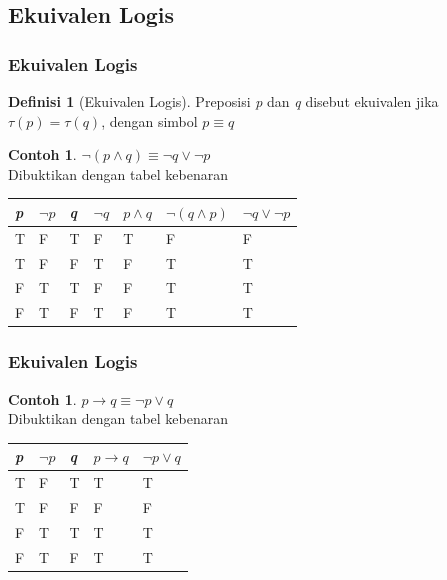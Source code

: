 \documentclass[handout]{beamer}
\theoremstyle{definition}
\newtheorem{definisi}[theorem]{Definisi}
\theoremstyle{example}
\newtheorem{contoh}[theorem]{Contoh}
\begin{document}
\subsection{Ekuivalen Logis}
\begin{frame}
   \frametitle{Ekuivalen Logis}
   \begin{definisi}[Ekuivalen Logis]
   	 Preposisi \textit{p} dan \textit{q} disebut ekuivalen jika $\tau(p)=\tau(q)$, dengan simbol $p \equiv q$
   \end{definisi}
   
   \begin{contoh}
   	$\neg(p \wedge q) \equiv \neg q \vee \neg p$\\
   	Dibuktikan dengan tabel kebenaran\\
   	\begin{tabular}{ | l | l | l | l | l | l | l |}
   		\hline
   		\textit{p} & $\neg p$& \textit{q} &$\neg q$& $p \wedge q$  & $\neg(q \wedge p)$& $\neg q \vee \neg p$\\ \hline
   		T & F & T & F & T & F & F \\ \hline
   		T & F & F & T & F & T & T  \\ \hline
   		F & T & T & F & F & T & T\\ \hline
   		F & T & F & T & F & T & T \\     		 
   		\hline
   	\end{tabular}
   \end{contoh}	
   
\end{frame}

\begin{frame}
	\frametitle{Ekuivalen Logis}	
	\begin{contoh}
		$p \rightarrow q \equiv \neg p \vee q$\\
		Dibuktikan dengan tabel kebenaran\\
		\begin{tabular}{ | l | l | l | l |l |}
			\hline
			\textit{p} & $\neg p$ &  \textit{q} & $p \rightarrow q$  & $\neg p \vee q$\\ \hline
			T & F & T & T & T  \\ \hline
			T & F & F & F & F   \\ \hline
			F & T & T & T & T \\ \hline
			F & T & F & T & T  \\     		 
			\hline
		\end{tabular}
	\end{contoh}
\end{frame}	
	
\end{document}
